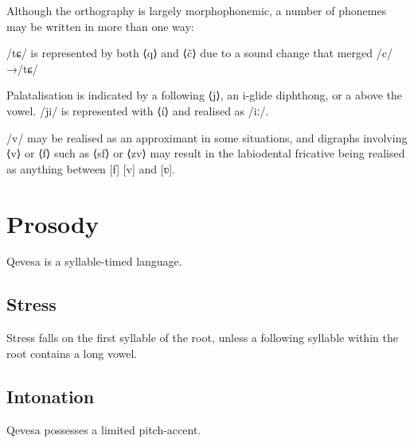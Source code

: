 \documentclass[grammar]{subfiles}
\begin{document}
  Although the orthography is largely morphophonemic, a number of phonemes may be written in more than one way:

  \begin{itemize*}
    \item	/tɕ/ is represented by both ⟨q⟩ and ⟨č⟩ due to a sound change that merged /c/→/tɕ/
    \item Palatalisation is indicated by a following ⟨j⟩, an i-glide diphthong, or a  above the vowel. /ji/ is represented with ⟨í⟩ and realised as /\superj iː/.
    \item /v/ may be realised as an approximant in some situations, and digraphs involving ⟨v⟩ or ⟨f⟩ such as ⟨sf⟩ or ⟨zv⟩ may result in the labiodental fricative being realised as anything between [f] [v] and [ʋ].
  \end{itemize*}

  \section{Prosody}
  \label{sec:prosody}

  Qevesa is a syllable-timed language.
  \ToBeWritten

  \subsection{Stress}
  \label{ssec:stress}

  Stress falls on the first syllable of the root, unless a following syllable within the root contains a long vowel. \ToBeWritten

  \subsection{Intonation}
  \label{ssec:intonation}

  Qevesa possesses a limited pitch-accent.
  \ToBeWritten
\end{document}
